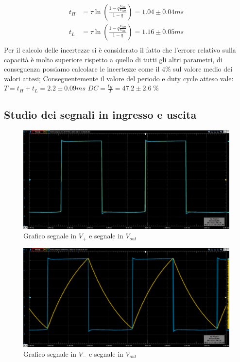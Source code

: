 \documentclass[10pt,a4paper]{article}
\begin{document}
\begin{align}
t_H &= \tau \ln\left(\frac{1 - q\frac{V_{OL}}{V_{OH}}}{1-q}\right) =1.04 \pm 0.04 ms\\
t_L &= \tau \ln\left(\frac{1 - q\frac{V_{OH}}{V_{OL}}}{1-q}\right) =1.16 \pm 0.05 ms\\
\end{align}
Per il calcolo delle incertezze si è considerato il fatto che l'errore relativo sulla capacità è molto superiore rispetto a quello di tutti gli altri parametri, di conseguenza possiamo calcolare le incertezze come il $4\%$ sul valore medio dei valori attesi;
Conseguentemente il valore del periodo e duty cycle atteso vale:
$T = t_H + t_L= 2.2 \pm 0.09 ms$
$DC = \frac{t_H}{T}=47.2 \pm 2.6 \; \si{\%}$


\setcounter{subsection}{2}
\subsection{Studio dei segnali in ingresso e uscita}

\begin{figure}[htbp]
\centering
\includegraphics[scale=0.4]{V+Vout}
\caption{Grafico segnale in $V_+$ e segnale in $V_{out}$}
\end{figure}

\begin{figure}[htbp]
\centering
\includegraphics[scale=0.4]{V-Vout}
\caption{Grafico segnale in $V_-$ e segnale in $V_{out}$}
\end{figure}
\end{document}
